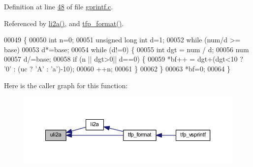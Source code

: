 Definition at line \hyperlink{a00043_source_l00048}{48} of file \hyperlink{a00043_source}{gprintf.\+c}.



Referenced by \hyperlink{a00043_source_l00066}{li2a()}, and \hyperlink{a00043_source_l00143}{tfp\+\_\+format()}.


\begin{DoxyCode}
00049     \{
00050     \textcolor{keywordtype}{int} n=0;
00051     \textcolor{keywordtype}{unsigned} \textcolor{keywordtype}{long} \textcolor{keywordtype}{int} d=1;
00052     \textcolor{keywordflow}{while} (num/d >= base)
00053         d*=base;         
00054     \textcolor{keywordflow}{while} (d!=0) \{
00055         \textcolor{keywordtype}{int} dgt = num / d;
00056         num%
00057         d/=base;
00058         \textcolor{keywordflow}{if} (n || dgt>0|| d==0) \{
00059             *bf++ = dgt+(dgt<10 ? \textcolor{charliteral}{'0'} : (uc ? \textcolor{charliteral}{'A'} : \textcolor{charliteral}{'a'})-10);
00060             ++n;
00061             \}
00062         \}
00063     *bf=0;
00064     \}
\end{DoxyCode}


Here is the caller graph for this function\+:\nopagebreak
\begin{figure}[H]
\begin{center}
\leavevmode
\includegraphics[width=350pt]{d6/d42/a00043_ac8448f6a2ace7b25fc6fbd5561fe5e75_icgraph}
\end{center}
\end{figure}


